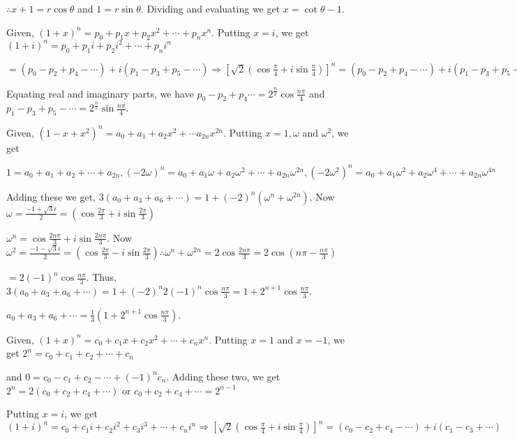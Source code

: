   $\therefore x + 1 = r \cos\theta$ and $1 = r \sin\theta$. Dividing and evaluating we get $x = \cot\theta -
  1$.
\item Given, $(1 + x)^n = p_0 + p_1x + p_2x^2 + \cdots + p_nx^n$. Putting $x = i$, we get $(1 + i)^n = p_0 + p_1i + p_2i^2 + \cdots + p_ni^n$

  $= (p_0 - p_2 + p_4 - \cdots) + i(p_1 - p_3 + p_5 - \cdots)\Rightarrow \left[\sqrt{2}\left(\cos\frac{\pi}{4} +
  i\sin\frac{\pi}{4}\right)\right]^n = (p_0 - p_2 + p_4 - \cdots) + i(p_1 - p_3 + p_5 - \cdots)$

  Equating real and imaginary parts, we have $p_0 - p_2 + p_4 \cdots = 2^{\frac{n}{2}}\cos\frac{n\pi}{4}$ and
  $p_1 - p_3 + p_5 - \cdots = 2^{\frac{n}{2}}\sin\frac{n\pi}{4}$.
\item Given, $(1 - x + x^2)^n = a_0 + a_1 + a_2x^2 + \cdots a_{2n}x^{2n}$. Putting $x = 1, \omega$ and $\omega^2$, we get

  $1 = a_0 + a_1 + a_2 + \cdots + a_{2n}, (-2\omega)^n = a_0 + a_1\omega + a_2\omega^2 + \cdots +
  a_{2n}\omega^{2n}, (-2\omega^2)^n = a_0 + a_1\omega^2 + a_2\omega^4 + \cdots +
  a_{2n}\omega^{4n}$

  Adding these we get, $3(a_0 + a_3 + a_6 + \cdots) = 1 + (-2)^n(\omega^n + \omega^{2n})$. Now $\omega =
  \frac{-1 + \sqrt{3}i}{2} = \left(\cos\frac{2\pi}{3} + i\sin \frac{2\pi}{3}\right)$

  $\omega^n = \cos\frac{2n\pi}{3} + i\sin\frac{2n\pi}{3}$. Now $\omega^2 = \frac{-1 - \sqrt{3}i}{2} =
  \left(\cos\frac{2\pi}{3} - i\sin \frac{2\pi}{3}\right)\therefore \omega^n + \omega^{2n} =
  2\cos\frac{2n\pi}{3} = 2\cos\left(n\pi - \frac{n\pi}{3}\right)$

  $= 2(-1)^n\cos\frac{n\pi}{3}$. Thus, $3(a_0 + a_3 + a_6 + \cdots) = 1 + (-2)^n2(-1)^n\cos\frac{n\pi}{3} = 1 +2^{n + 1}\cos\frac{n\pi}{3}$.

  $a_0 + a_3 + a_6 + \cdots = \frac{1}{3}\left(1 + 2^{n+1}\cos\frac{n\pi}{3}\right)$.
\item Given, $(1 + x)^n = c_0 + c_1x + c_2x^2 + \cdots + c_nx^n$. Putting $x = 1$ and $x = -1$, we get $2^n = c_0 + c_1 + c_2 + \cdots + c_n$

  and $0 = c_0 - c_1 + c_2 - \cdots + (-1)^nc_n$. Adding these two, we get $2^n = 2(c_0 + c_2 + c_4 +
  \cdots)$ or $c_0 + c_2 + c_4 + \cdots = 2^{n - 1}$

  Putting $x = i$, we get $(1 + i)^n = c_0 + c_1i + c_2i^2 + c_3i^3 + \cdots + c_ni^n\Rightarrow
  \left[\sqrt{2}\left(\cos\frac{\pi}{4}+i\sin\frac{\pi}{4}\right)\right]^n = (c_0 -c_2 + c_4 - \cdots) +
  i(c_1 - c_3 + \cdots)$

